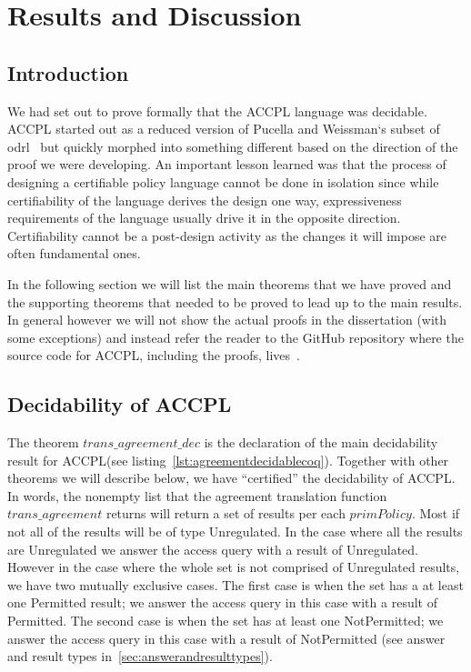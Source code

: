 \chapter{Results and Discussion}\label{chap:results}

                  
\section{Introduction}\label{sec:introresults}


We had set out to prove formally that the \ac{ACCPL} language was decidable. \ac{ACCPL} started out as a reduced version of Pucella and Weissman`s subset of \ac{odrl}~\cite{pucella2006} but quickly morphed into something different based on the direction of the proof we were developing. An important lesson learned was that the process of designing a certifiable policy language cannot be done in isolation since while certifiability of the language derives the design one way, expressiveness requirements of the language usually drive it in the opposite direction. Certifiability cannot be a post-design activity as the changes it will impose are often fundamental ones.

In the following section we will list the main theorems that we have proved and the supporting theorems that needed to be proved to lead up to the main results. In general however we will not show the actual proofs in the dissertation (with some exceptions) and instead refer the reader to the GitHub repository where the source code for \ac{ACCPL}, including the proofs, lives~\cite{BahmanSistany2015}.

\section{Decidability of ACCPL}\label{sec:maintheorems}

The theorem $trans\_agreement\_dec$ is the declaration of the main decidability result for \ac{ACCPL}(see listing~\ref{lst:agreementdecidablecoq}). Together with other theorems we will describe below, we have ``certified'' the decidability of \ac{ACCPL}. In words, the nonempty list that the agreement translation function $trans\_agreement$ returns will return a set of results per each $primPolicy$. Most if not all of the results will be of type Unregulated. In the case where all the results are Unregulated we answer the access query with a result of Unregulated. However in the case where the whole set is not comprised of Unregulated results, we have two mutually exclusive cases. The first case is when the set has a at least one Permitted result; we answer the access query in this case with a result of Permitted. The second case is when the set has at least one NotPermitted; we answer the access query in this case with a result of NotPermitted (see answer and result types in~\ref{sec:answerandresulttypes}).


